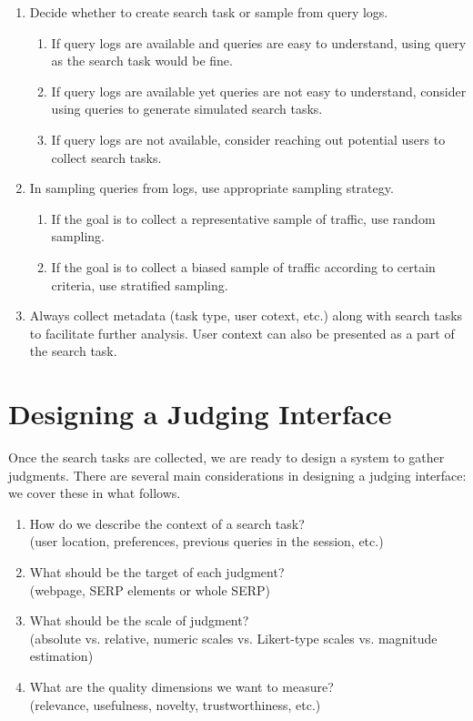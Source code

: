 \begin{enumerate}
	\item Decide whether to create search task or sample from query logs. 
	\begin{enumerate}
		\item If query logs are available and queries are easy to understand, using query as the search task would be fine. 
		\item If query logs are available yet queries are not easy to understand, consider using queries to generate simulated search tasks.
		\item If query logs are not available, consider reaching out potential users to collect search tasks.
	\end{enumerate}
	\item In sampling queries from logs, use appropriate sampling strategy. 
	\begin{enumerate}
		\item If the goal is to collect a representative sample of traffic, use random sampling.
		\item If the goal is to collect a biased sample of traffic according to certain criteria, use stratified sampling.
	\end{enumerate}
	\item Always collect metadata (task type, user cotext, etc.) along with search tasks to facilitate further analysis. User context can also be presented as a part of the search task.
\end{enumerate}

\section{Designing a Judging Interface}

Once the search tasks are collected, we are ready to design a system to gather judgments. There are several main considerations in designing a judging interface: we cover these in what follows.

\begin{enumerate}
	\item  How do we describe the context of a search task? \\(user location, preferences, previous queries in the session, etc.)
	\item  What should be the target of each judgment? \\(webpage, SERP elements or whole SERP)
	\item  What should be the scale of judgment? \\(absolute vs. relative, numeric scales vs. Likert-type scales vs. magnitude estimation)	
	\item  What are the quality dimensions we want to measure? \\(relevance, usefulness, novelty, trustworthiness, etc.)
\end{enumerate}

